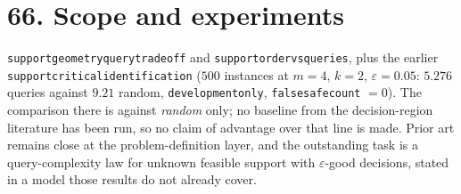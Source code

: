 \documentclass[9pt,twocolumn]{article}
\renewcommand{\_}{\CIGunderscore\allowbreak}
\begin{document}
\section*{66. Scope and experiments}
\texttt{support\_geometry\_query\_tradeoff} and \texttt{support\_order\_vs\_queries}, plus the earlier \texttt{support\_critical\_identification} ($500$ instances at $m{=}4$, $k{=}2$, $\varepsilon{=}0.05$: $5.276$ queries against $9.21$ random, \texttt{development\_only}, \texttt{false\_safe\_count} $=0$). The comparison there is against \emph{random} only; no baseline from the decision-region literature has been run, so no claim of advantage over that line is made. Prior art remains close at the problem-definition layer, and the outstanding task is a query-complexity law for unknown feasible support with $\varepsilon$-good decisions, stated in a model those results do not already cover.
\end{document}
